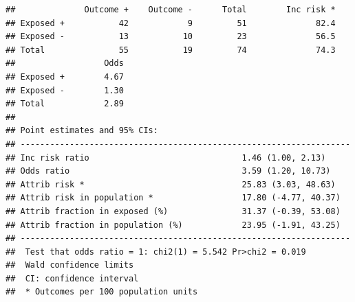 \documentclass[]{book}
\newenvironment{Shaded}{\begin{snugshade}}{\end{snugshade}}
\newcommand{\CommentTok}[1]{\textcolor[rgb]{0.56,0.35,0.01}{\textit{#1}}}
\newcommand{\DataTypeTok}[1]{\textcolor[rgb]{0.13,0.29,0.53}{#1}}
\newcommand{\DecValTok}[1]{\textcolor[rgb]{0.00,0.00,0.81}{#1}}
\newcommand{\KeywordTok}[1]{\textcolor[rgb]{0.13,0.29,0.53}{\textbf{#1}}}
\newcommand{\NormalTok}[1]{#1}
\newcommand{\OperatorTok}[1]{\textcolor[rgb]{0.81,0.36,0.00}{\textbf{#1}}}
\newcommand{\StringTok}[1]{\textcolor[rgb]{0.31,0.60,0.02}{#1}}
\begin{document}
\begin{Shaded}
\end{Shaded}

\begin{verbatim}
##              Outcome +    Outcome -      Total        Inc risk *
## Exposed +           42            9         51              82.4
## Exposed -           13           10         23              56.5
## Total               55           19         74              74.3
##                  Odds
## Exposed +        4.67
## Exposed -        1.30
## Total            2.89
## 
## Point estimates and 95% CIs:
## -------------------------------------------------------------------
## Inc risk ratio                               1.46 (1.00, 2.13)
## Odds ratio                                   3.59 (1.20, 10.73)
## Attrib risk *                                25.83 (3.03, 48.63)
## Attrib risk in population *                  17.80 (-4.77, 40.37)
## Attrib fraction in exposed (%)               31.37 (-0.39, 53.08)
## Attrib fraction in population (%)            23.95 (-1.91, 43.25)
## -------------------------------------------------------------------
##  Test that odds ratio = 1: chi2(1) = 5.542 Pr>chi2 = 0.019
##  Wald confidence limits
##  CI: confidence interval
##  * Outcomes per 100 population units
\end{verbatim}
\end{document}
